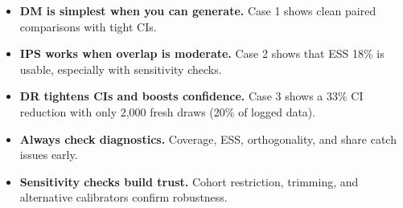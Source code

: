 \begin{itemize}
\item \textbf{DM is simplest when you can generate.} Case 1 shows clean paired comparisons with tight CIs.
\item \textbf{IPS works when overlap is moderate.} Case 2 shows that ESS 18\% is usable, especially with sensitivity checks.
\item \textbf{DR tightens CIs and boosts confidence.} Case 3 shows a 33\% CI reduction with only 2,000 fresh draws (20\% of logged data).
\item \textbf{Always check diagnostics.} Coverage, ESS, orthogonality, and \oua{} share catch issues early.
\item \textbf{Sensitivity checks build trust.} Cohort restriction, trimming, and alternative calibrators confirm robustness.
\end{itemize}

